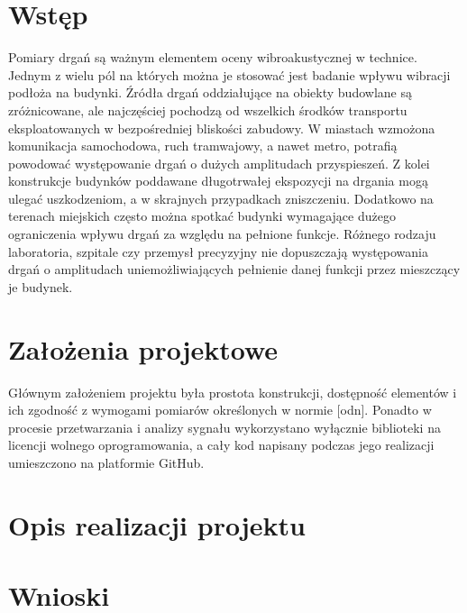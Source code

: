 \documentclass[a4paper,12pt]{mwart}
\begin{document}
\section{Wstęp}
Pomiary drgań są ważnym elementem oceny wibroakustycznej w technice. Jednym z
wielu pól na których można je stosować jest badanie wpływu wibracji podłoża na
budynki. Źródła drgań oddziałujące na obiekty budowlane są zróżnicowane, ale
najczęściej pochodzą od wszelkich środków transportu eksploatowanych w
bezpośredniej bliskości zabudowy. W miastach wzmożona komunikacja samochodowa,
ruch tramwajowy, a nawet metro, potrafią powodować występowanie drgań o dużych
amplitudach przyspieszeń. Z kolei konstrukcje budynków poddawane długotrwałej
ekspozycji na drgania mogą ulegać uszkodzeniom, a w skrajnych przypadkach
zniszczeniu. Dodatkowo na terenach miejskich często można spotkać budynki
wymagające dużego ograniczenia wpływu drgań za względu na pełnione funkcje.
Różnego rodzaju laboratoria, szpitale czy przemysł precyzyjny nie dopuszczają
występowania drgań o amplitudach uniemożliwiających pełnienie danej funkcji
przez mieszczący je budynek.

\section{Założenia projektowe}
Głównym założeniem projektu była prostota konstrukcji, dostępność elementów i
ich zgodność z wymogami pomiarów określonych w normie [odn]. Ponadto w procesie
przetwarzania i analizy sygnału wykorzystano wyłącznie biblioteki na licencji
wolnego oprogramowania, a cały kod napisany podczas jego realizacji umieszczono
na platformie GitHub.

\section{Opis realizacji projektu}

\section{Wnioski}
\end{document}

